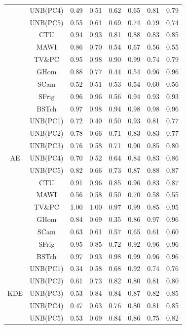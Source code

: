 \documentclass{article}
\begin{document}
\begin{longtable}[c]{|c|c|c|c|c|c|c|c|}
&UNB(PC4) & 0.49 & 0.51 & 0.62 & 0.65 & 0.81 & 0.79 \\ 
&UNB(PC5) & 0.55 & 0.61 & 0.69 & 0.74 & 0.79 & 0.74 \\ 
\cmidrule{2-8}
&CTU & 0.94 & 0.93 & 0.81 & 0.88 & 0.83 & 0.85\\ 
\cmidrule{2-8}
&MAWI & 0.86 & 0.70 & 0.54 & 0.67 & 0.56 & 0.55\\ 
\cmidrule{2-8}
&TV\&PC & 0.95 & 0.98 & 0.90 & 0.99 & 0.74 & 0.79\\ 
\cmidrule{2-8}
&GHom & 0.88 & 0.77 & 0.44 & 0.54 & 0.96 & 0.96\\ 
&SCam & 0.52 & 0.51 & 0.53 & 0.54 & 0.60 & 0.56\\ 
&SFrig & 0.96 & 0.96 & 0.56 & 0.94 & 0.93 & 0.93 \\ 
&BSTch & 0.97 & 0.98 & 0.94 & 0.98 & 0.98 & 0.96  \\ 
\midrule
\multirow{7}{*}{AE} &UNB(PC1) & 0.72 & 0.40 & 0.50 & 0.93 & 0.81 & 0.77  \\ 
&UNB(PC2) & 0.78 & 0.66 & 0.71 & 0.83 & 0.83 & 0.77  \\ 
&UNB(PC3) & 0.76 & 0.58 & 0.71 & 0.90 & 0.85 & 0.80 \\ 
&UNB(PC4) & 0.70 & 0.52 & 0.64 & 0.84 & 0.83 & 0.86 \\ 
&UNB(PC5) & 0.82 & 0.66 & 0.73 & 0.87 & 0.88 & 0.87 \\ 
\cmidrule{2-8}
&CTU & 0.91 & 0.96 & 0.85 & 0.96 & 0.83 & 0.87\\ 
\cmidrule{2-8}
&MAWI & 0.56 & 0.58 & 0.50 & 0.70 & 0.58 & 0.55\\ 
\cmidrule{2-8}
&TV\&PC & 1.00 & 1.00 & 0.97 & 0.99 & 0.85 & 0.95\\ 
\cmidrule{2-8}
&GHom & 0.84 & 0.69 & 0.35 & 0.86 & 0.97 & 0.96\\ 
&SCam & 0.63 & 0.61 & 0.57 & 0.65 & 0.61 & 0.60\\ 
&SFrig & 0.95 & 0.85 & 0.72 & 0.92 & 0.96 & 0.96 \\ 
&BSTch & 0.97 & 0.93 & 0.98 & 0.99 & 0.96 & 0.96  \\ 
\midrule
\multirow{7}{*}{KDE} &UNB(PC1) & 0.34 & 0.58 & 0.68 & 0.92 & 0.74 & 0.76  \\ 
&UNB(PC2) & 0.61 & 0.73 & 0.82 & 0.80 & 0.81 & 0.80  \\ 
&UNB(PC3) & 0.53 & 0.84 & 0.84 & 0.87 & 0.82 & 0.85 \\ 
&UNB(PC4) & 0.47 & 0.63 & 0.76 & 0.80 & 0.81 & 0.85 \\ 
&UNB(PC5) & 0.53 & 0.69 & 0.84 & 0.86 & 0.75 & 0.82 \\ 

\end{longtable}
\end{document}
